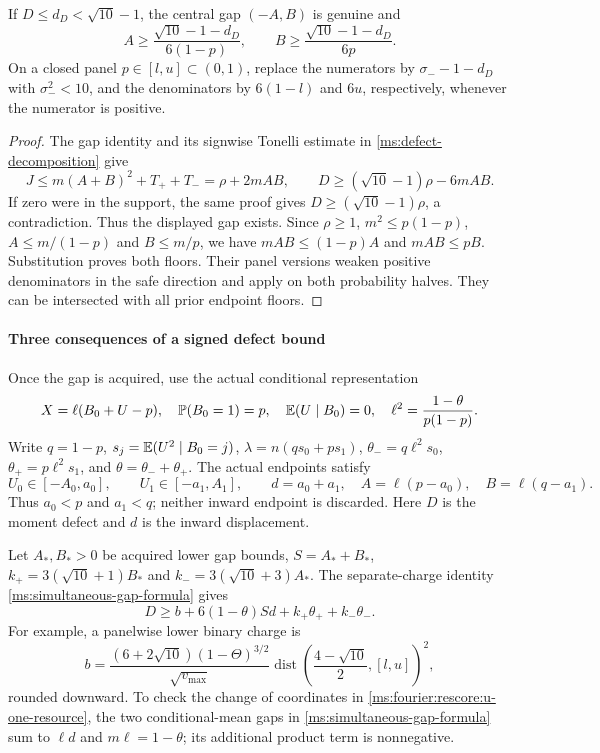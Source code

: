 \begin{lemma}\label{ms:fourier:rescore:u-product}
If $D\le d_D<\sqrt{10}-1$, the central gap $(-A,B)$ is genuine and
\[
 A\ge\frac{\sqrt{10}-1-d_D}{6(1-p)},\qquad
 B\ge\frac{\sqrt{10}-1-d_D}{6p}.
\]
On a closed panel $p\in[l,u]\subset(0,1)$, replace the numerators
by $\sigma_- -1-d_D$ with $\sigma_-^2<10$, and the denominators
by $6(1-l)$ and $6u$, respectively, whenever the numerator is positive.
\end{lemma}
\begin{proof}
The gap identity and its signwise Tonelli estimate in
\eqref{ms:defect-decomposition} give
\[
 J\le m(A+B)^2+T_++T_-=\rho+2mAB,
 \qquad D\ge(\sqrt{10}-1)\rho-6mAB.
\]
If zero were in the support, the same proof gives
$D\ge(\sqrt{10}-1)\rho$, a contradiction.  Thus the displayed gap
exists.  Since $\rho\ge1$, $m^2\le p(1-p)$,
$A\le m/(1-p)$ and $B\le m/p$, we have
$mAB\le(1-p)A$ and $mAB\le pB$.
Substitution proves both floors.  Their panel versions weaken positive
denominators in the safe direction and apply on both probability halves.
They can be intersected with all prior endpoint floors.
\end{proof}

\paragraph{Three consequences of a signed defect bound}\label{ms:fourier:rescore:u-geometry}

Once the gap is acquired, use the actual conditional representation
\begin{equation}\label{ms:fourier:rescore:u-coordinates}
 X=\ell(B_0+U-p),\quad\mathbb P(B_0=1)=p,\quad
 \mathbb E(U\mid B_0)=0,\quad
 \ell^2=\frac{1-\theta}{p(1-p)}.
\end{equation}
Write $q=1-p$, $s_j=\mathbb E(U^2\mid B_0=j)$,
$\lambda=n(qs_0+ps_1)$,
$\theta_-=q\ell^2s_0$, $\theta_+=p\ell^2s_1$, and
$\theta=\theta_-+\theta_+$.  The actual endpoints satisfy
\[
 U_0\in[-A_0,a_0],\qquad U_1\in[-a_1,A_1],\qquad
 d=a_0+a_1,\quad A=\ell(p-a_0),\quad B=\ell(q-a_1).
\]
Thus $a_0<p$ and $a_1<q$; neither inward endpoint is discarded.
Here $D$ is the moment defect and $d$ is the inward displacement.

Let $A_*,B_*>0$ be acquired lower gap bounds, $S=A_*+B_*$,
$k_+=3(\sqrt{10}+1)B_*$ and
$k_-=3(\sqrt{10}+3)A_*$.
The separate-charge identity \eqref{ms:simultaneous-gap-formula} gives
\begin{equation}\label{ms:fourier:rescore:u-one-resource}
 D\ge b+6(1-\theta)S d+k_+\theta_++k_-\theta_-.
\end{equation}
For example, a panelwise lower binary charge is
\[
 b=\frac{(6+2\sqrt{10})(1-\Theta)^{3/2}}{\sqrt{v_{\max}}}
       \operatorname{dist}\left(\frac{4-\sqrt{10}}2,[l,u]\right)^2,
\]
rounded downward.  To check the change of coordinates in
\eqref{ms:fourier:rescore:u-one-resource}, the two conditional-mean gaps in
\eqref{ms:simultaneous-gap-formula} sum to $\ell d$ and
$m\ell=1-\theta$; its additional product term is nonnegative.


